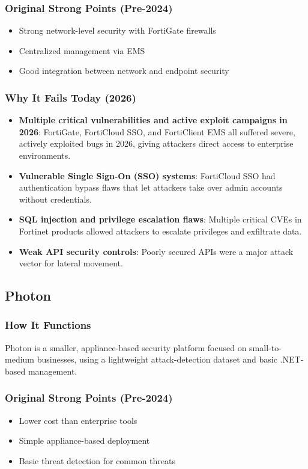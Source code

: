 \documentclass[12pt,letterpaper]{report}
\begin{document}
\subsubsection{Original Strong Points (Pre-2024)}
\begin{itemize}
    \item Strong network-level security with FortiGate firewalls
    \item Centralized management via EMS
    \item Good integration between network and endpoint security
\end{itemize}

\subsubsection{Why It Fails Today (2026)}
\begin{itemize}
    \item \textbf{Multiple critical vulnerabilities and active exploit campaigns in 2026}: FortiGate, FortiCloud SSO, and FortiClient EMS all suffered severe, actively exploited bugs in 2026, giving attackers direct access to enterprise environments.
    \item \textbf{Vulnerable Single Sign-On (SSO) systems}: FortiCloud SSO had authentication bypass flaws that let attackers take over admin accounts without credentials.
    \item \textbf{SQL injection and privilege escalation flaws}: Multiple critical CVEs in Fortinet products allowed attackers to escalate privileges and exfiltrate data.
    \item \textbf{Weak API security controls}: Poorly secured APIs were a major attack vector for lateral movement.
\end{itemize}

\subsection{Photon}
\subsubsection{How It Functions}
Photon is a smaller, appliance-based security platform focused on small-to-medium businesses, using a lightweight attack-detection dataset and basic .NET-based management.

\subsubsection{Original Strong Points (Pre-2024)}
\begin{itemize}
    \item Lower cost than enterprise tools
    \item Simple appliance-based deployment
    \item Basic threat detection for common threats
\end{itemize}
\end{document}
